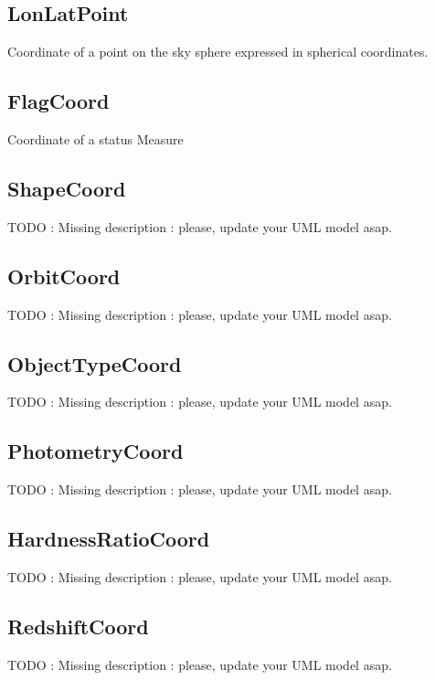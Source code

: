   \subsection{LonLatPoint}
  \label{sect:stcextend.LonLatPoint}
  Coordinate of a point on the sky sphere expressed in spherical coordinates.

  \subsection{FlagCoord}
  \label{sect:stcextend.FlagCoord}
  Coordinate of a status Measure

  \subsection{ShapeCoord}
  \label{sect:stcextend.ShapeCoord}
  TODO : Missing description : please, update your UML model asap.

  \subsection{OrbitCoord}
  \label{sect:stcextend.OrbitCoord}
  TODO : Missing description : please, update your UML model asap.

  \subsection{ObjectTypeCoord}
  \label{sect:stcextend.ObjectTypeCoord}
  TODO : Missing description : please, update your UML model asap.

  \subsection{PhotometryCoord}
  \label{sect:stcextend.PhotometryCoord}
  TODO : Missing description : please, update your UML model asap.

  \subsection{HardnessRatioCoord}
  \label{sect:stcextend.HardnessRatioCoord}
  TODO : Missing description : please, update your UML model asap.

  \subsection{RedshiftCoord}
  \label{sect:stcextend.RedshiftCoord}
  TODO : Missing description : please, update your UML model asap.

